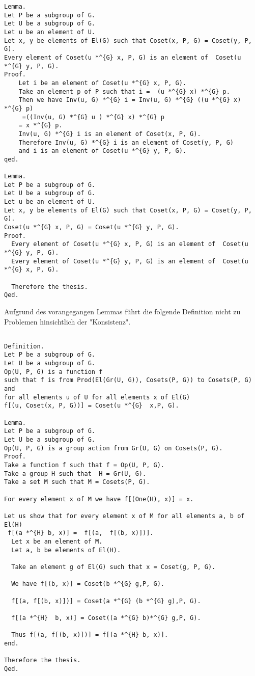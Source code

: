 \documentclass[a4paper,12pt]{scrartcl}
\begin{document}
\begin{lstlisting}
Lemma.
Let P be a subgroup of G.
Let U be a subgroup of G.
Let u be an element of U.
Let x, y be elements of El(G) such that Coset(x, P, G) = Coset(y, P, G). 
Every element of Coset(u *^{G} x, P, G) is an element of  Coset(u *^{G} y, P, G).
Proof.
    Let i be an element of Coset(u *^{G} x, P, G).
    Take an element p of P such that i =  (u *^{G} x) *^{G} p.
    Then we have Inv(u, G) *^{G} i = Inv(u, G) *^{G} ((u *^{G} x) *^{G} p)
     =((Inv(u, G) *^{G} u ) *^{G} x) *^{G} p
    = x *^{G} p.
    Inv(u, G) *^{G} i is an element of Coset(x, P, G).
    Therefore Inv(u, G) *^{G} i is an element of Coset(y, P, G)
    and i is an element of Coset(u *^{G} y, P, G).
qed.

Lemma.
Let P be a subgroup of G.
Let U be a subgroup of G.
Let u be an element of U.
Let x, y be elements of El(G) such that Coset(x, P, G) = Coset(y, P, G). 
Coset(u *^{G} x, P, G) = Coset(u *^{G} y, P, G).
Proof.
  Every element of Coset(u *^{G} x, P, G) is an element of  Coset(u *^{G} y, P, G).
  Every element of Coset(u *^{G} y, P, G) is an element of  Coset(u *^{G} x, P, G).

  Therefore the thesis.
Qed.

\end{lstlisting}

Aufgrund des vorangegangen Lemmas führt die folgende Definition nicht zu Problemen hinsichtlich der "Konsistenz".

\begin{lstlisting}

Definition.
Let P be a subgroup of G.
Let U be a subgroup of G.
Op(U, P, G) is a function f 
such that f is from Prod(El(Gr(U, G)), Cosets(P, G)) to Cosets(P, G) and
for all elements u of U for all elements x of El(G) 
f[(u, Coset(x, P, G))] = Coset(u *^{G}  x,P, G).

Lemma.
Let P be a subgroup of G.
Let U be a subgroup of G.
Op(U, P, G) is a group action from Gr(U, G) on Cosets(P, G).
Proof.
Take a function f such that f = Op(U, P, G).
Take a group H such that  H = Gr(U, G).
Take a set M such that M = Cosets(P, G).

For every element x of M we have f[(One(H), x)] = x.

Let us show that for every element x of M for all elements a, b of El(H)
 f[(a *^{H} b, x)] =  f[(a,  f[(b, x)])].
  Let x be an element of M.
  Let a, b be elements of El(H).

  Take an element g of El(G) such that x = Coset(g, P, G).

  We have f[(b, x)] = Coset(b *^{G} g,P, G).

  f[(a, f[(b, x)])] = Coset(a *^{G} (b *^{G} g),P, G).

  f[(a *^{H}  b, x)] = Coset((a *^{G} b)*^{G} g,P, G).

  Thus f[(a, f[(b, x)])] = f[(a *^{H} b, x)].
end.

Therefore the thesis.
Qed.


\end{lstlisting}
\end{document}
